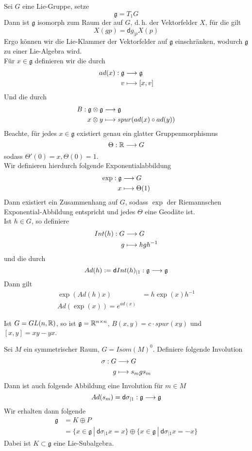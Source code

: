 \documentclass{book}
\renewcommand{\i}{^{-1}}
\renewcommand{\d}{\textsf{d}}
\begin{document}
\newcommand{\g}{\mathfrak{g}}
\Bem{}
Sei $G$ eine Lie-Gruppe, setze
\[ \g = T_1G \]
Dann ist $\g$ isomorph zum Raum der  auf $G$, d.\,h. der Vektorfelder $X$, für die gilt
\[ X(gp) = \d g_{|p}X(p) \]
Ergo können wir die Lie-Klammer der Vektorfelder auf $\g$ einschränken, wodurch $\g$ zu einer Lie-Algebra wird.\\
Für $x\in\g$ definieren wir die  durch
\begin{align*}
ad(x) : \g & \Pfeil{} \g\\
v & \longmapsto [x,v]
\end{align*}
Und die  durch
\begin{align*}
B : \g \otimes \g &\Pfeil{} \g\\
x \otimes y & \longmapsto spur(ad(x) \circ ad(y))
\end{align*}
Beachte, für jedes $x \in \g$ existiert genau ein glatter Gruppenmorphismus
\[ \Theta : \mathbb{R} \overset{}{\longrightarrow} G \]
sodass $\Theta'(0) = x, \Theta(0) = 1$.\\
Wir definieren hierdurch folgende Exponentialabbildung
\begin{align*}
\exp : \g &\Pfeil{} G\\
x &\longmapsto \Theta(1)
\end{align*}
Dann existiert ein Zusammenhang auf $G$, sodass $\exp$ der Riemannschen Exponential-Abbildung entspricht und jedes $\Theta$ eine Geodäte ist.\\
Ist $h\in G$, so definiere
\begin{align*}
Int(h) :G& \Pfeil{} G\\
g & \longmapsto hgh\i
\end{align*}
und die  durch
\[ Ad(h) := \d Int(h)_{|1} : \g \Pfeil{} \g \]
Dann gilt
\begin{align*}
\exp(Ad(h)x) &= h\exp(x)h\i\\
Ad(\exp(x)) = e^{ad(x)}
\end{align*}

\Bem{}
Ist $G = GL(n,\mathbb{R})$, so ist $\g = \R^{n\times n}$, $B(x,y) = c \cdot spur(xy)$ und $[x,y] = xy -yx$. 

\Bem{}
Sei $M$ ein symmetrischer Raum, $G = Isom(M)^0$. Definiere folgende Involution
\begin{align*}
\sigma : G &\overset{}{\longrightarrow} G\\
g &\longmapsto s_mgs_m
\end{align*}
Dann ist auch folgende Abbildung eine Involution für $m \in M$
\[ Ad(s_m) = \d\sigma_{|1} : \g \Pfeil{} \g \]
Wir erhalten dann folgende 
\begin{align*}
\g &= K \oplus P\\
&= \{ x \in \g ~|~ \d\sigma_{|1}x = x \} \oplus \{ x \in \g ~|~ \d\sigma_{|1}x = -x \}
\end{align*}
Dabei ist $K \subset \g$ eine Lie-Subalgebra.
\end{document}
